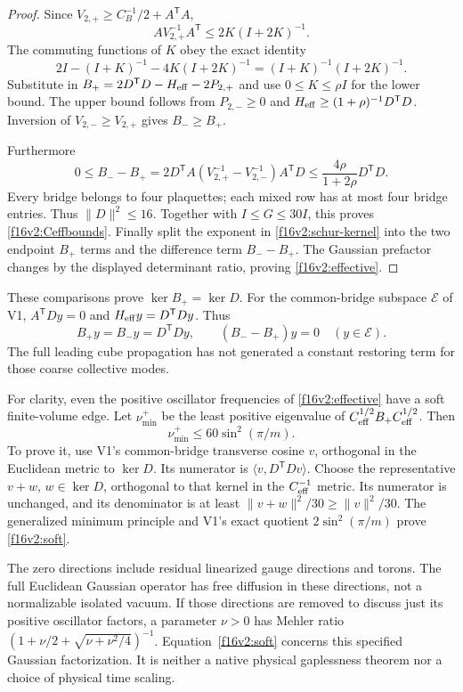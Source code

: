 \documentclass[11pt,oneside]{article}
\begin{document}
\begin{proof}
Since \(V_{2,+}\ge C_B^{-1}/2+A^{\mathsf T}A\),
\[
 A V_{2,+}^{-1}A^{\mathsf T}
              \le2K(I+2K)^{-1}.
\]
The commuting functions of \(K\) obey the exact identity
\[
 2I-(I+K)^{-1}-4K(I+2K)^{-1}
                    =(I+K)^{-1}(I+2K)^{-1}.
\]
Substitute in \(B_+=2D^{\mathsf T}D-H_{\rm eff}-2P_{2,+}\)
and use \(0\le K\le\rho I\) for the lower bound.
The upper bound follows from \(P_{2,-}\ge0\) and
\(H_{\rm eff}\ge(1+\rho)^{-1}D^{\mathsf T}D\).
Inversion of \(V_{2,-}\ge V_{2,+}\) gives \(B_-\ge B_+\).

Furthermore
\[
 0\le B_--B_+
   =2D^{\mathsf T}A(V_{2,+}^{-1}-V_{2,-}^{-1})A^{\mathsf T}D
   \le\frac{4\rho}{1+2\rho}D^{\mathsf T}D.
\]
Every bridge belongs to four plaquettes; each mixed row has at
most four bridge entries. Thus \(\|D\|^2\le16\).
Together with \(I\le G\le30I\), this proves
\eqref{f16v2:Ceffbounds}. Finally split the exponent in
\eqref{f16v2:schur-kernel} into the two endpoint \(B_+\)
terms and the difference term \(B_--B_+\).
The Gaussian prefactor changes by the displayed determinant
ratio, proving \eqref{f16v2:effective}.
\end{proof}

These comparisons prove \(\ker B_+=\ker D\).
For the common-bridge subspace \(\mathcal E\) of V1,
\(A^{\mathsf T}Dy=0\) and \(H_{\rm eff}y=D^{\mathsf T}Dy\).
Thus
\[
 B_+y=B_-y=D^{\mathsf T}Dy,\qquad
            (B_--B_+)y=0\quad(y\in\mathcal E).
\]
The full leading cube propagation has not generated a constant
restoring term for those coarse collective modes.

For clarity, even the positive oscillator frequencies of
\eqref{f16v2:effective} have a soft finite-volume edge.
Let \(\nu_{\min}^+\) be the least positive eigenvalue of
\(C_{\rm eff}^{1/2}B_+C_{\rm eff}^{1/2}\).
Then
\begin{equation}
                     \nu_{\min}^+\le60\sin^2(\pi/m).
 \label{f16v2:soft}
\end{equation}
To prove it, use V1's common-bridge transverse cosine \(v\),
orthogonal in the Euclidean metric to \(\ker D\).
Its numerator is \(\langle v,D^{\mathsf T}Dv\rangle\).
Choose the representative \(v+w\), \(w\in\ker D\), orthogonal
to that kernel in the \(C_{\rm eff}^{-1}\) metric.
Its numerator is unchanged, and its denominator is at least
\(\|v+w\|^2/30\ge\|v\|^2/30\).
The generalized minimum principle and V1's exact quotient
\(2\sin^2(\pi/m)\) prove \eqref{f16v2:soft}.

The zero directions include residual linearized gauge directions
and torons. The full Euclidean Gaussian operator has free
diffusion in these directions, not a normalizable isolated vacuum.
If those directions are removed to discuss just its positive
oscillator factors, a parameter \(\nu>0\) has Mehler ratio
\((1+\nu/2+\sqrt{\nu+\nu^2/4})^{-1}\).
Equation~\eqref{f16v2:soft} concerns this specified Gaussian
factorization. It is neither a native physical gaplessness
theorem nor a choice of physical time scaling.
\end{document}
